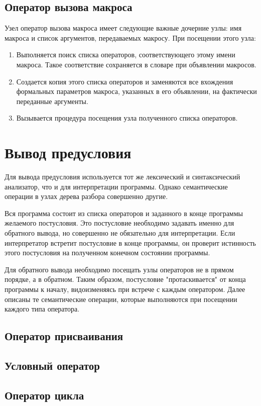 \subsection{Оператор вызова макроса}
Узел оператор вызова макроса имеет следующие важные дочерние узлы: имя макроса и список аргументов, передаваемых макросу.
При посещении этого узла:
\begin{enumerate}
    \item Выполняется поиск списка операторов, соответствующего этому имени макроса. Такое соответствие сохраняется в словаре
    при объявлении макросов.
    \item Создается копия этого списка операторов и заменяются все вхождения формальных параметров макроса,
    указанных в его объявлении, на фактически переданные аргументы.
    \item Вызывается процедура посещения узла полученного списка операторов.
\end{enumerate}


\section{Вывод предусловия}
Для вывода предусловия используется тот же лексический и синтаксический анализатор,
что и для интерпретации программы. Однако семантические операции в узлах дерева разбора совершенно другие.

Вся программа состоит из списка операторов и заданного в конце программы желаемого постусловия. Это постусловие
необходимо задавать именно для обратного вывода, но совершенно не обязательно для интерпретации. Если
интерпретатор встретит постусловие в конце программы, он проверит истинность этого постусловия на полученном конечном состоянии программы.

Для обратного вывода необходимо посещать узлы операторов не в прямом порядке, а в обратном. Таким образом,
постусловие "протаскивается" от конца программы к началу, видоизменяясь при встрече с каждым оператором.
Далее описаны те семантические операции, которые выполняются при посещении каждого типа оператора.

\subsection{Оператор присваивания}
\subsection{Условный оператор}
\subsection{Оператор цикла}
